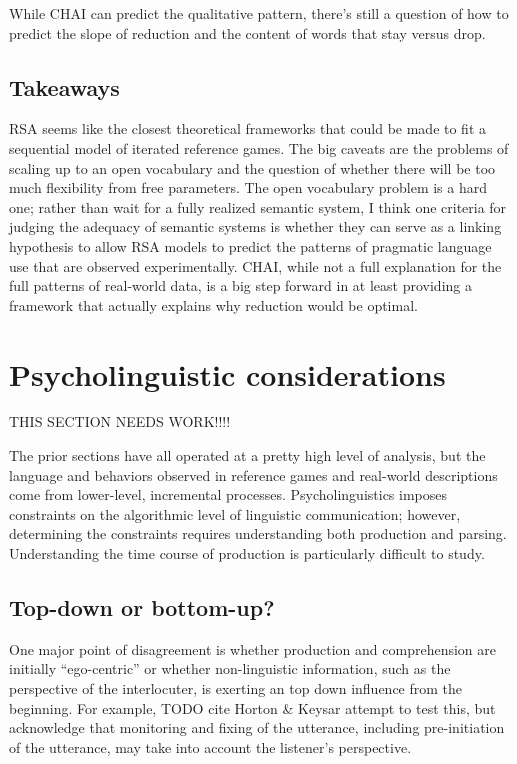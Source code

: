 \documentclass[]{article}
\begin{document}
While CHAI can predict the qualitative pattern, there's still a question of how to predict the slope of reduction and the content of words that stay versus drop. 


\subsection{Takeaways}
RSA seems like the closest theoretical frameworks that could be made to fit a sequential model of iterated reference games. The big caveats are the problems of scaling up to an open vocabulary and the question of whether there will be too much flexibility from free parameters. The open vocabulary problem is a hard one; rather than wait for a fully realized semantic system, I think one criteria for judging the adequacy of semantic systems is whether they can serve as a linking hypothesis to allow RSA models to predict the patterns of pragmatic language use that are observed experimentally. 
CHAI, while not a full explanation for the full patterns of real-world data, is a big step forward in at least providing a framework that actually explains why reduction would be optimal. 

\section{Psycholinguistic considerations}
THIS SECTION NEEDS WORK!!!!

The prior sections have all operated at a pretty high level of analysis, but the language and behaviors observed in reference games and real-world descriptions come from lower-level, incremental processes. Psycholinguistics imposes constraints on the algorithmic level of linguistic communication; however, determining the constraints requires understanding both production and parsing. Understanding the time course of production is particularly difficult to study. 

\subsection{Top-down or bottom-up?}
One major point of disagreement is whether production and comprehension are initially ``ego-centric'' or whether non-linguistic information, such as the perspective of the interlocuter, is exerting an top down influence from the beginning. For example, TODO cite Horton \& Keysar attempt to test this, but acknowledge that monitoring and fixing of the utterance, including pre-initiation of the utterance, may take into account the listener's perspective. %
\end{document}
